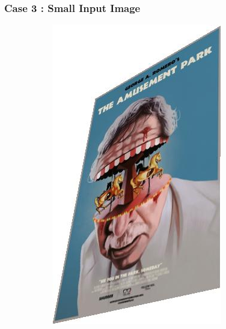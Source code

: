\documentclass{article}
\begin{document}
\subsubsection{Case 3 : Small Input Image}
\begin{figure}[H]
    \centering
    \begin{subfigure}{.3\textwidth}
        \centering
        \includegraphics[scale=0.5]{q2/output/transform_small.jpg}
    \end{subfigure}
    \begin{subfigure}{.3\textwidth}
        \centering

\end{subfigure}
\end{figure}
\end{document}
